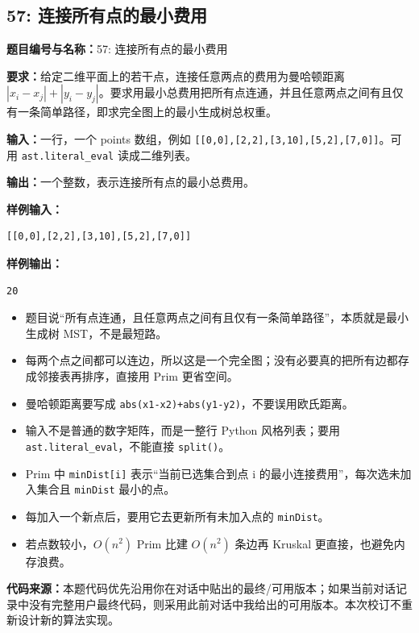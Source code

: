 \documentclass[10pt,a4paper,fontset=none]{ctexart}
\newcommand{\codesource}{\par\noindent\textbf{代码来源：}本题代码优先沿用你在对话中贴出的最终/可用版本；如果当前对话记录中没有完整用户最终代码，则采用此前对话中我给出的可用版本。本次校订不重新设计新的算法实现。\par\vspace{0.2em}}
\begin{document}
\subsection{57: 连接所有点的最小费用}
\begin{taskbox}
\textbf{题目编号与名称：}57: 连接所有点的最小费用\par
\textbf{要求：}给定二维平面上的若干点，连接任意两点的费用为曼哈顿距离 $|x_i-x_j|+|y_i-y_j|$。要求用最小总费用把所有点连通，并且任意两点之间有且仅有一条简单路径，即求完全图上的最小生成树总权重。\par
\textbf{输入：}一行，一个 points 数组，例如 \texttt{[[0,0],[2,2],[3,10],[5,2],[7,0]]}。可用 \texttt{ast.literal\_eval} 读成二维列表。\par
\textbf{输出：}一个整数，表示连接所有点的最小总费用。\par
\textbf{样例输入：}
\begin{lstlisting}[style=sample]
[[0,0],[2,2],[3,10],[5,2],[7,0]]
\end{lstlisting}
\textbf{样例输出：}
\begin{lstlisting}[style=sample]
20
\end{lstlisting}
\end{taskbox}
\begin{mistakebox}
\begin{itemize}
  \item 题目说“所有点连通，且任意两点之间有且仅有一条简单路径”，本质就是最小生成树 MST，不是最短路。
  \item 每两个点之间都可以连边，所以这是一个完全图；没有必要真的把所有边都存成邻接表再排序，直接用 Prim 更省空间。
  \item 曼哈顿距离要写成 \texttt{abs(x1-x2)+abs(y1-y2)}，不要误用欧氏距离。
  \item 输入不是普通的数字矩阵，而是一整行 Python 风格列表；要用 \texttt{ast.literal\_eval}，不能直接 \texttt{split()}。
  \item Prim 中 \texttt{minDist[i]} 表示“当前已选集合到点 i 的最小连接费用”，每次选未加入集合且 \texttt{minDist} 最小的点。
  \item 每加入一个新点后，要用它去更新所有未加入点的 \texttt{minDist}。
  \item 若点数较小，$O(n^2)$ Prim 比建 $O(n^2)$ 条边再 Kruskal 更直接，也避免内存浪费。
\end{itemize}
\end{mistakebox}
\codesource
\end{document}
